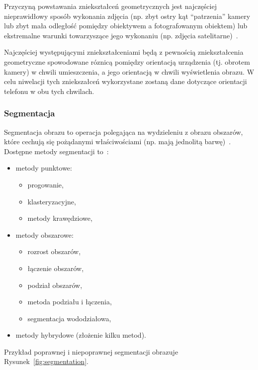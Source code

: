 Przyczyną powstawania zniekształceń geometrycznych jest najczęściej nieprawidłowy sposób wykonania zdjęcia (np. zbyt ostry kąt ``patrzenia'' kamery lub zbyt mała odległość pomiędzy obiektywem a fotografowanym obiektem) lub ekstremalne warunki towarzyszące jego wykonaniu (np. zdjęcia satelitarne)~\cite{geo:tools}.

Najczęściej występującymi zniekształceniami będą z pewnością zniekształcenia geometryczne spowodowane róznicą pomiędzy orientacją urządzenia (tj. obrotem kamery) w chwili umieszczenia, a jego orientacją w chwili wyświetlenia obrazu.
W celu niwelacji tych zniekszałceń wykorzystane zostaną dane dotyczące orientacji telefonu w obu tych chwilach.



\subsubsection{Segmentacja}
Segmentacja obrazu to operacja polegająca na wydzieleniu z obrazu obszarów, które cechują się pożądanymi właściwościami (np. mają jednolitą barwę)~\cite{anal:przet:obr}.
Dostępne metody segmentacji to~\cite{roz:obr}:
\begin{itemize}
 \item metody punktowe:
  \begin{itemize}
   \item progowanie,
   \item klasteryzacyjne,
   \item metody krawędziowe,
  \end{itemize}
 \item metody obszarowe:
  \begin{itemize}
   \item rozrost obszarów,
   \item łączenie obszarów,
   \item podział obszarów,
   \item metoda podziału i łączenia,
   \item segmentacja wododziałowa,
  \end{itemize}
 \item metody hybrydowe (złożenie kilku metod).
\end{itemize}

Przykład poprawnej i niepoprawnej segmentacji obrazuje Rysunek~\ref{fig:segmentation}.



